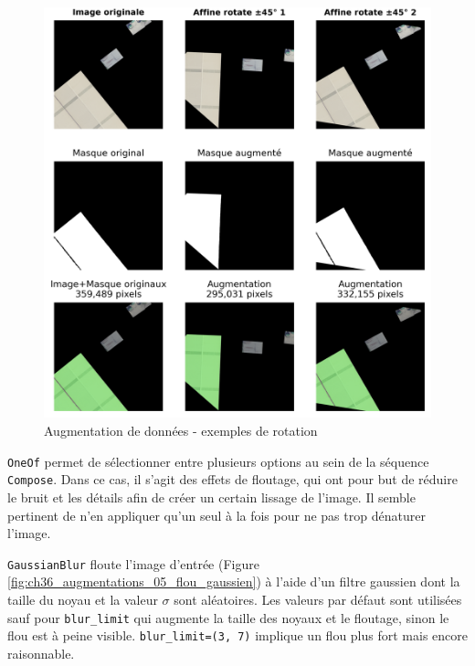 \begin{figure}[H]
    \centering
    \includegraphics[width=1\linewidth]{02-main/figures/ch3/ch36_augmentations_04_rotation.png}
    \caption{Augmentation de données - exemples de rotation}
    \label{fig:ch36_augmentations_04_rotation}
\end{figure}

\newpage
\texttt{OneOf} permet de sélectionner entre plusieurs options au sein de la séquence \texttt{Compose}. Dans ce cas, il s'agit des effets de floutage, qui ont pour but de réduire le bruit et les détails afin de créer un certain lissage de l'image. Il semble pertinent de n'en appliquer qu'un seul à la fois pour ne pas trop dénaturer l'image.

\texttt{GaussianBlur} floute l'image d'entrée (Figure \ref{fig:ch36_augmentations_05_flou_gaussien}) à l'aide d'un filtre gaussien dont la taille du noyau et la valeur $\sigma$ sont aléatoires. Les valeurs par défaut sont utilisées sauf pour \texttt{blur\_limit} qui augmente la taille des noyaux et le floutage, sinon le flou est à peine visible. \texttt{blur\_limit=(3, 7)} implique un flou plus fort mais encore raisonnable.


